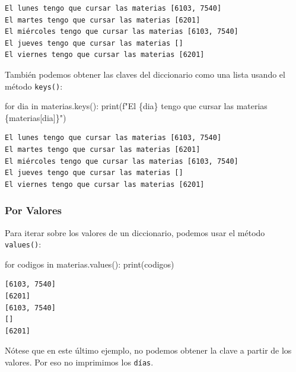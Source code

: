 \documentclass[
  letterpaper,
  DIV=11,
  numbers=noendperiod]{scrreprt}
\newenvironment{Shaded}{\begin{snugshade}}{\end{snugshade}}
\newcommand{\BuiltInTok}[1]{\textcolor[rgb]{0.00,0.23,0.31}{#1}}
\newcommand{\ControlFlowTok}[1]{\textcolor[rgb]{0.00,0.23,0.31}{#1}}
\newcommand{\KeywordTok}[1]{\textcolor[rgb]{0.00,0.23,0.31}{#1}}
\newcommand{\NormalTok}[1]{\textcolor[rgb]{0.00,0.23,0.31}{#1}}
\newcommand{\SpecialCharTok}[1]{\textcolor[rgb]{0.37,0.37,0.37}{#1}}
\newcommand{\SpecialStringTok}[1]{\textcolor[rgb]{0.13,0.47,0.30}{#1}}
\begin{document}
\begin{verbatim}
El lunes tengo que cursar las materias [6103, 7540]
El martes tengo que cursar las materias [6201]
El miércoles tengo que cursar las materias [6103, 7540]
El jueves tengo que cursar las materias []
El viernes tengo que cursar las materias [6201]
\end{verbatim}

También podemos obtener las claves del diccionario como una lista usando
el método \texttt{keys()}:

\begin{Shaded}
\begin{Highlighting}[]
\ControlFlowTok{for}\NormalTok{ dia }\KeywordTok{in}\NormalTok{ materias.keys():}
    \BuiltInTok{print}\NormalTok{(}\SpecialStringTok{f"El }\SpecialCharTok{\{}\NormalTok{dia}\SpecialCharTok{\}}\SpecialStringTok{ tengo que cursar las materias }\SpecialCharTok{\{}\NormalTok{materias[dia]}\SpecialCharTok{\}}\SpecialStringTok{"}\NormalTok{)}
\end{Highlighting}
\end{Shaded}

\begin{verbatim}
El lunes tengo que cursar las materias [6103, 7540]
El martes tengo que cursar las materias [6201]
El miércoles tengo que cursar las materias [6103, 7540]
El jueves tengo que cursar las materias []
El viernes tengo que cursar las materias [6201]
\end{verbatim}

\subsubsection{Por Valores}\label{por-valores}

Para iterar sobre los valores de un diccionario, podemos usar el método
\texttt{values()}:

\begin{Shaded}
\begin{Highlighting}[]
\ControlFlowTok{for}\NormalTok{ codigos }\KeywordTok{in}\NormalTok{ materias.values():}
    \BuiltInTok{print}\NormalTok{(codigos)}
\end{Highlighting}
\end{Shaded}

\begin{verbatim}
[6103, 7540]
[6201]
[6103, 7540]
[]
[6201]
\end{verbatim}

Nótese que en este último ejemplo, no podemos obtener la clave a partir
de los valores. Por eso no imprimimos los \texttt{días}.
\end{document}
